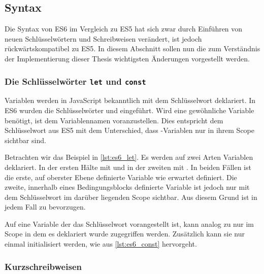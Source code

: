 \subsection{Syntax}
\label{ssec:ge_syntax}

Die Syntax von ES6 im Vergleich zu ES5 hat sich zwar durch Einführen von neuen
Schlüsselwörtern und Schreibweisen verändert, ist jedoch rückwärtskompatibel zu
ES5.  In diesem Abschnitt sollen nun die zum Verständnis der Implementierung
dieser Thesis wichtigsten Änderungen vorgestellt werden.

\subsubsection{Die Schlüsselwörter \texttt{let} und \texttt{const}}
\label{sssec:ges_let_und_const}

Variablen werden in JavaScript bekanntlich mit dem Schlüsselwort 
deklariert.  In ES6 wurden die Schlüsselwörter  und 
eingeführt.  Wird eine gewöhnliche Variable benötigt, ist  dem
Variablennamen voranzustellen.  Dies entspricht dem Schlüsselwort  aus
ES5 mit dem Unterschied, dass -Variablen nur in ihrem Scope sichtbar
sind.

Betrachten wir das Beispiel in \cref{lst:es6_let}.  Es werden auf zwei Arten
Variablen deklariert.  In der ersten Hälte mit  und in der zweiten mit
.  In beiden Fällen ist die erste, auf oberster Ebene definierte
Variable wie erwartet definiert.  Die zweite, innerhalb eines Bedingungsblocks
definierte Variable ist jedoch nur mit dem Schlüsselwort  im
darüber liegenden Scope sichtbar.  Aus diesem Grund ist   in
jedem Fall zu bevorzugen.



Auf eine Variable der das Schlüsselwort  vorangestellt ist, kann
analog zu  nur im Scope in dem es deklariert wurde zugegriffen werden.
Zusätzlich kann sie nur einmal initialisiert werden, wie aus
\cref{lst:es6_const} hervorgeht.



\subsubsection{Kurzschreibweisen}
\label{sssec:ges_kurzschreibweisen}

